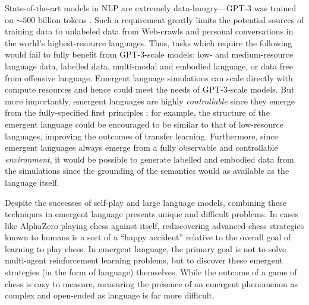 State-of-the-art models in NLP are extremely data-hungry---GPT-3 was trained on ${\sim}500$ billion tokens \citep{brown2020language}.
Such a requirement greatly limits the potential sources of training data to unlabeled data from Web-crawls and personal conversations in the world's highest-resource languages.
Thus, tasks which require the following would fail to fully benefit from GPT-3-scale models:
    low- and medium-resource language data,
    labelled data,
    multi-modal and embodied language,
    or data free from offensive language.
Emergent language simulations can scale directly with compute resources and hence could meet the needs of GPT-3-scale models.
But more importantly, emergent languages are highly \emph{controllable} since they emerge from the fully-specified first principles ; for example, the structure of the emergent language could be encouraged to be similar to that of low-resource languages, improving the outcomes of transfer learning.
Furthermore, since emergent languages always emerge from a fully observable and controllable \emph{environment}, it would be possible to generate labelled and embodied data from the simulations since the grounding of the semantics would as available  as the language itself.


Despite the successes of self-play and large language models, combining these techniques in emergent language presents unique and difficult problems.
In cases like AlphaZero playing chess against itself, rediscovering advanced chess strategies known to humans is a sort of a ``happy accident'' relative to the overall goal of learning to play chess.
In emergent language, the primary goal is not to solve multi-agent reinforcement learning problems, but to discover these emergent strategies (in the form of language) themselves.
While the outcome of a game of chess is easy to measure, measuring the presence of an emergent phenomenon as complex and open-ended as language is far more difficult.

